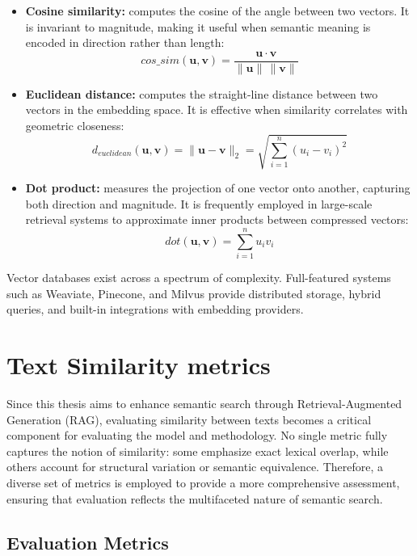 \begin{itemize}
    \item \textbf{Cosine similarity:} computes the cosine of the angle between two vectors. It is invariant to magnitude, making it useful when semantic meaning is encoded in direction rather than length:  
    \[
        \textit{cos\_sim}(\mathbf{u}, \mathbf{v}) = \frac{\mathbf{u} \cdot \mathbf{v}}{\|\mathbf{u}\| \, \|\mathbf{v}\|}
    \]
    
    \item \textbf{Euclidean distance:} computes the straight-line distance between two vectors in the embedding space. It is effective when similarity correlates with geometric closeness:  
    \[
        d_{\textit{euclidean}}(\mathbf{u}, \mathbf{v}) = \|\mathbf{u} - \mathbf{v}\|_2 = \sqrt{\sum_{i=1}^n (u_i - v_i)^2}
    \]
    
    \item \textbf{Dot product:} measures the projection of one vector onto another, capturing both direction and magnitude. It is frequently employed in large-scale retrieval systems to approximate inner products between compressed vectors:  
    \[
        \textit{dot}(\mathbf{u}, \mathbf{v}) = \sum_{i=1}^n u_i v_i
    \]
\end{itemize}


Vector databases exist across a spectrum of complexity. Full-featured systems such as Weaviate, Pinecone, and Milvus provide distributed storage, hybrid queries, and built-in integrations with embedding providers.

\section{Text Similarity metrics}
Since this thesis aims to enhance semantic search through Retrieval-Augmented Generation (\gls{RAG}), 
evaluating similarity between texts becomes a critical component for evaluating the model and methodology. 
No single metric fully captures the notion of similarity: some emphasize exact lexical overlap, 
while others account for structural variation or semantic equivalence. 
Therefore, a diverse set of metrics is employed to provide a more comprehensive assessment, 
ensuring that evaluation reflects the multifaceted nature of semantic search.

\subsection{Evaluation Metrics}

